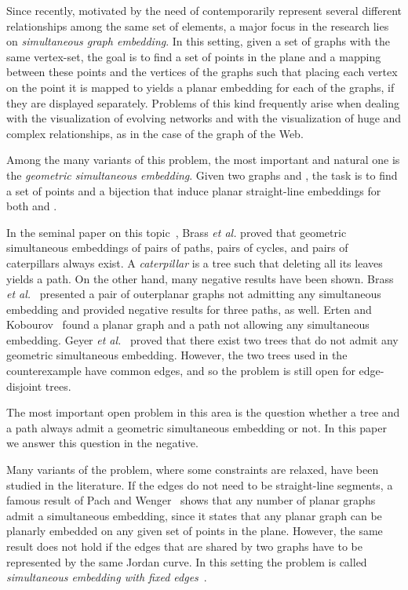 \documentclass[a4paper,10pt]{llncs}
\begin{document}
Since recently, motivated by the need of contemporarily represent several different relationships among the same set of elements, a major focus in the research lies on \emph{simultaneous graph embedding}. In this setting, given a set of graphs with the same vertex-set, the goal is to find a set of points in the plane and a mapping between these points and the vertices of the graphs such that placing each vertex on the point it is mapped to yields a planar embedding for each of the graphs, if they are displayed separately. Problems of this kind frequently arise when dealing with the visualization of evolving networks and with the visualization of huge and complex relationships, as in the case of the graph of the Web.

Among the many variants of this problem, the most important and natural one is the \emph{geometric simultaneous embedding}. Given two graphs  and , the task is to find a set of points  and a bijection  that induce planar straight-line embeddings for both  and .

In the seminal paper on this topic~\cite{J-bcdeeiklm-spge-07}, Brass \emph{et al.} proved that geometric simultaneous embeddings of pairs of paths, pairs of cycles, and pairs of caterpillars always exist. A \emph{caterpillar} is a tree such that deleting all its leaves yields a path. On the other hand, many negative results have been shown. Brass \emph{et al.}~\cite{J-bcdeeiklm-spge-07} presented a pair of outerplanar graphs not admitting any simultaneous embedding and provided negative results for three paths, as well. Erten and Kobourov~\cite{ek-sepgfb-04} found a planar graph and a path not allowing any simultaneous embedding. Geyer \emph{et al.}~\cite{gkv-ttsids-09} proved that there exist two trees that do not admit any geometric simultaneous embedding. However, the two trees used in the counterexample have common edges, and so the problem is still open for edge-disjoint trees.

The most important open problem in this area is the question whether a tree and a path always admit a geometric simultaneous embedding or not. In this paper we answer this question in the negative.

Many variants of the problem, where some constraints are relaxed, have been studied in the literature. If the edges do not need to be straight-line segments, a famous result of Pach and Wenger~\cite{pw-epgfvl-01} shows that any number of planar graphs admit a simultaneous embedding, since it states that any planar graph can be planarly embedded on any given set of points in the plane. However, the same result does not hold if the edges that are shared by two graphs have to be represented by the same Jordan curve. In this setting the problem is called {\it simultaneous embedding with fixed edges}~\cite{f-egsfe-06,gjpss-sgefe-06,fjks-crppgasefe-08}.
\end{document}

